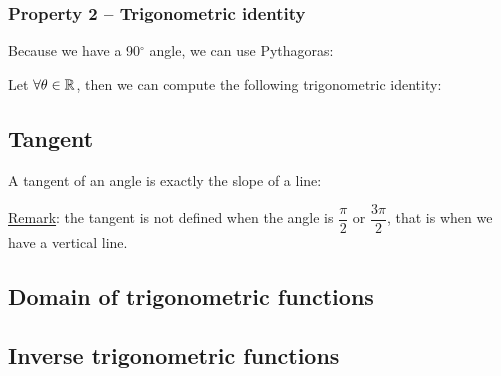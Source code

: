 \documentclass{article}
\begin{document}
\subsubsection{Property 2 -- Trigonometric identity}
Because we have a 90$^\circ$ angle, we can use Pythagoras: 

Let $\displaystyle \forall \theta \in \mathbb{R}$, then we can compute the following trigonometric identity:

\subsection{Tangent}
A tangent of an angle is exactly the slope of a line:

\underline{Remark}: the tangent is not defined when the angle is $\dfrac{\pi}{2}$
or $\dfrac{3\pi}{2}$, that is when we have a vertical line.

\subsection{Domain of trigonometric functions}

\newpage
\subsection{Inverse trigonometric functions}
\end{document}
